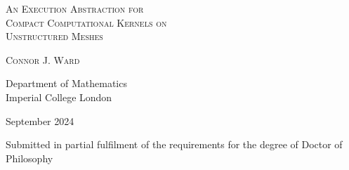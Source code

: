 \begin{titlepage}
  \begin{center}
    \vspace*{1cm}

    \LARGE
    \textsc{An Execution Abstraction for\\Compact Computational Kernels on\\Unstructured Meshes}

    \vspace{1.5cm}

    \Large
    \textsc{Connor J. Ward}

    \vspace{5cm}

    \large

    Department of Mathematics \\
    Imperial College London

    \vspace{1cm}

    September 2024

    \vfill

    \begin{minipage}{.75\textwidth}
      \centering
      Submitted in partial fulfilment of the requirements for the degree of Doctor of Philosophy
    \end{minipage}

    \vspace{0.8cm}
  \end{center}
\end{titlepage}
